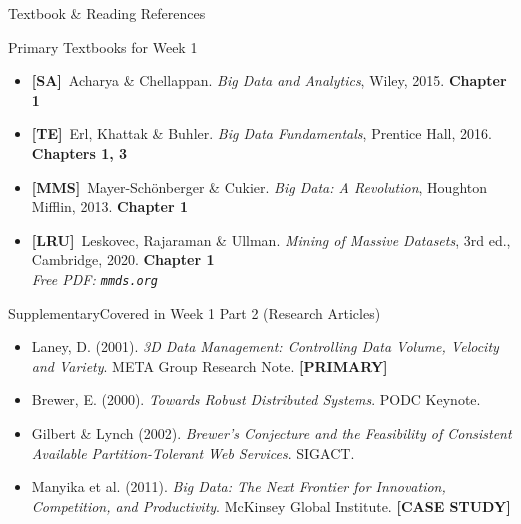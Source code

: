 \documentclass[aspectratio=169,10pt]{beamer}
\begin{document}
\begin{frame}{Textbook \& Reading References}
  \begin{block}{Primary Textbooks for Week 1}
    \begin{itemize}
      \item \textbf{[SA]}\ Acharya \& Chellappan. \textit{Big Data and Analytics}, Wiley, 2015.
            \hfill \textbf{Chapter 1}
      \item \textbf{[TE]}\ Erl, Khattak \& Buhler. \textit{Big Data Fundamentals}, Prentice Hall, 2016.
            \hfill \textbf{Chapters 1, 3}
      \item \textbf{[MMS]}\ Mayer-Schönberger \& Cukier. \textit{Big Data: A Revolution}, Houghton Mifflin, 2013.
            \hfill \textbf{Chapter 1}
      \item \textbf{[LRU]}\ Leskovec, Rajaraman \& Ullman. \textit{Mining of Massive Datasets}, 3rd ed., Cambridge, 2020.
            \hfill \textbf{Chapter 1} \\
            {\small\itshape Free PDF: \texttt{mmds.org}}
    \end{itemize}
  \end{block}
  \vspace{6pt}
  \begin{exampleblock}{Supplementary\textemdash Covered in Week 1 Part 2 (Research Articles)}
    \small
    \begin{itemize}
      \item Laney, D. (2001). \textit{3D Data Management: Controlling Data Volume, Velocity and Variety}. META Group Research Note. \textbf{[PRIMARY]}
      \item Brewer, E. (2000). \textit{Towards Robust Distributed Systems}. PODC Keynote.
      \item Gilbert \& Lynch (2002). \textit{Brewer's Conjecture and the Feasibility of Consistent Available Partition-Tolerant Web Services}. SIGACT.
      \item Manyika et al. (2011). \textit{Big Data: The Next Frontier for Innovation, Competition, and Productivity}. McKinsey Global Institute. \textbf{[CASE STUDY]}
    \end{itemize}
  \end{exampleblock}
\end{frame}
\end{document}
